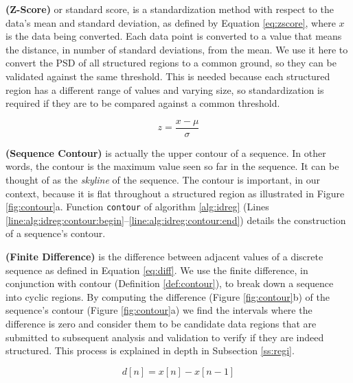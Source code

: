 \begin{definition}\textbf{(Z-Score)}\label{def:zscore} or standard
score\cite{CVeveritt2006cambridge}, is a standardization method with respect to
the data's mean and standard deviation, as defined by Equation \ref{eq:zscore},
where $x$ is the data being converted. Each data point is converted to a value
that means the distance, in number of standard deviations, from the mean.
We use it here to convert the PSD of all structured regions to a common ground, so they
can be validated against the same threshold. This is needed because each
structured region has a different range of values and varying size, so
standardization is required if they are to be compared against a common
threshold.

\begin{small}
\begin{equation}\label{eq:zscore}
    z = \frac{x -\mu}{\sigma}
\end{equation}
\end{small}

\end{definition}

\vspace{-0.7cm}

\begin{definition}\textbf{(Sequence Contour)}\label{def:contour} is actually the
upper contour of a sequence. In other words, the contour is the maximum value
seen so far in the sequence. It can be thought of as the \textit{skyline} of the
sequence.
The contour is important, in our context, because it is flat throughout a
structured region as illustrated in Figure \ref{fig:contour}a. Function
\texttt{contour} of algorithm \ref{alg:idreg} (Lines
\ref{line:alg:idreg:contour:begin}--\ref{line:alg:idreg:contour:end}) details
the construction of a sequence's contour.
\end{definition}

\begin{definition}\textbf{(Finite Difference)}\label{def:diff} is the difference
between adjacent values of a discrete sequence as defined in Equation
\ref{eq:diff}.
We use the finite difference, in conjunction with contour (Definition
\ref{def:contour}), to break down a sequence into cyclic regions. 
By computing the difference (Figure \ref{fig:contour}b) of the sequence's
contour (Figure \ref{fig:contour}a) we find the intervals where the difference
is zero and consider them to be candidate data regions that are submitted to
subsequent analysis and validation to verify if they are indeed structured.
This process is explained in depth in Subsection \ref{ss:regi}.


\begin{small}
\begin{equation}\label{eq:diff}
    d[n] = x[n] - x[n - 1]
\end{equation}
\end{small}

\end{definition}

